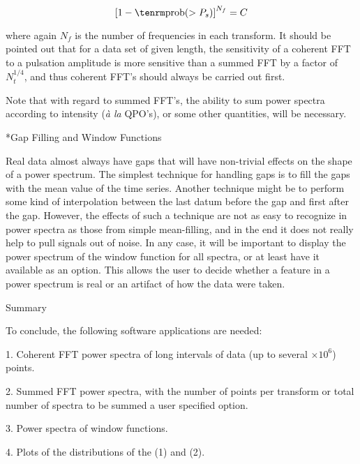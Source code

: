 $$\left[ 1 - {\rm prob}(>P_s)\right]^{N_f} = C$$

{\list

where again $N_{f}$ is the number of frequencies in each transform.  It should
be pointed out that for a data set of given length, the sensitivity of a
coherent FFT to a pulsation amplitude is more sensitive than a summed FFT
by a factor of $N_{t}^{1/4}$, and thus coherent FFT's 
should always be carried out first.

Note that with regard to summed FFT's, the ability to sum power spectra
according to intensity ({\it \`a la} QPO's), or some other quantities, will be
necessary.

}

\**Gap Filling and Window Functions

{\list

Real data almost always have gaps that will have non-trivial effects on the
shape of a power spectrum.  The simplest technique for handling gaps is to fill
the gaps with the mean value of the time series.  Another technique might be to
perform some kind of interpolation between the last datum before the gap and
first after the gap.  However, the effects of such a technique are not as easy
to recognize in power spectra as those from simple mean-filling, and in the
end it does not really help to pull signals out of noise.  In any case, it will
be important to display the power spectrum of the window function for all
spectra, or at least have it available as an option.  This allows the user to
decide whether a feature in a power spectrum is real or an artifact of how the
data were taken.

}

\@{Summary}

\item{}To conclude, the following software applications are needed:

\item{1.} Coherent FFT power spectra of long intervals of data
(up to several $\times 10^{6}$) points.

\item{2.} Summed FFT power spectra, with the number of points per transform or total
number of spectra to be summed a user specified option.

\item{3.} Power spectra of window functions.

\item{4.} Plots of the distributions of the (1) and (2).

